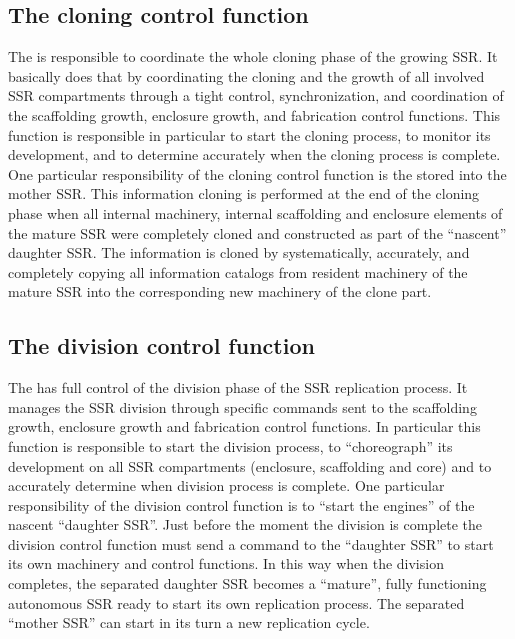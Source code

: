 \subsection[The cloning control function]{The cloning control function}

The  is responsible to coordinate the whole cloning phase of the
growing SSR. It basically does that by coordinating the cloning and the
growth of all involved SSR compartments through a tight control,
synchronization, and coordination of the scaffolding growth, enclosure
growth, and fabrication control functions. This function is responsible
in particular to start the cloning process, to monitor its development,
and to determine accurately when the cloning process is complete. One
particular responsibility of the cloning control function is the
 stored into the mother SSR. This
information cloning is performed at the end of the cloning phase when
all internal machinery, internal scaffolding and enclosure elements of
the mature SSR were completely cloned and constructed as part of the
“nascent” daughter SSR. The information is cloned by systematically,
accurately, and completely copying all information catalogs from
resident machinery of the mature SSR into the corresponding new
machinery of the clone part.

\subsection[The division control function]{The division control
function}

The  has full control of the division phase of the SSR replication
process. It manages the SSR division through specific commands sent to
the scaffolding growth, enclosure growth and fabrication control
functions.  In particular this function is responsible to start the
division process, to “choreograph” its development on all SSR
compartments (enclosure, scaffolding and core) and to accurately
determine when division process is complete. One particular
responsibility of the division control function is to “start the
engines” of the nascent “daughter SSR”. Just before the moment the
division is complete the division control function must send a command
to the “daughter SSR” to start its own machinery and control functions.
In this way when the division completes, the separated daughter SSR
becomes a “mature”, fully functioning autonomous SSR ready to start its
own replication process. The separated “mother SSR” can start in its
turn a new replication cycle.

